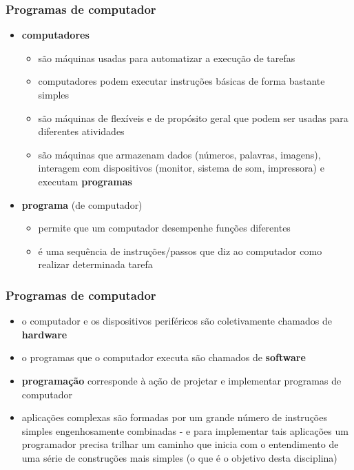 \documentclass[aspectratio=169]{beamer}
\begin{document}
\begin{frame}\frametitle{Programas de computador}
\begin{itemize}
	\item \textbf{computadores}
	\begin{itemize}
		\item são máquinas usadas para automatizar a execução de tarefas
		\item computadores podem executar instruções básicas de forma bastante simples
		\item são máquinas de flexíveis e de propósito geral que podem ser usadas para diferentes atividades
		\item são máquinas que armazenam dados (números, palavras, imagens), interagem com dispositivos (monitor, sistema de som, impressora) e executam \textbf{programas}
	\end{itemize}
	\item \textbf{programa} (de computador)
	\begin{itemize}
		\item permite que um computador desempenhe funções diferentes
		\item é uma sequência de instruções/passos que diz ao computador como realizar determinada tarefa
	\end{itemize}
\end{itemize}
\end{frame}

\begin{frame}\frametitle{Programas de computador}
\begin{itemize}
	\item o computador e os dispositivos periféricos são coletivamente chamados de \textbf{hardware}
	\item o programas que o computador executa são chamados de \textbf{software}
	\item \textbf{programação} corresponde à ação de projetar e implementar programas de computador
	\item aplicações complexas são formadas por um grande número de instruções simples engenhosamente combinadas - e para implementar tais aplicações um programador precisa trilhar um caminho que inicia com o entendimento de uma série de construções mais simples (o que é o objetivo desta disciplina)
\end{itemize}
\end{frame}
\end{document}
